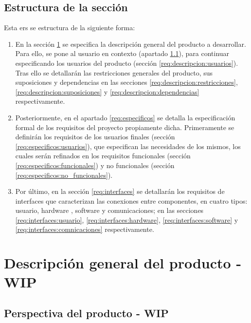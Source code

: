         
    \subsection{Estructura de la sección}

        Esta \gls{ers} se estructura de la siguiente forma:

        \begin{enumerate}
            \item En la sección \ref{req:descripcion} se especifica la descripción general del producto a desarrollar. Para ello, se pone al usuario en contexto (apartado \ref{req:descripcion:perspectiva}), para continuar especificando los usuarios del producto (sección \ref{req:descripcion:usuarios}). Tras ello se detallarán las restricciones generales del producto, sus suposiciones y dependencias en las secciones 
            \ref{req:descripcion:restricciones}, \ref{req:descripcion:suposiciones} y \ref{req:descripcion:dependencias} respectivamente.
            \item Posteriormente, en el apartado \ref{req:especificos} se detalla la especificación formal de los requisitos del proyecto propiamente dicha. Primeramente se definirán los requisitos de los usuarios finales (sección \ref{req:especificos:usuarios}), que especifican las necesidades de los mismos, los cuales serán refinados en los requisitos funcionales (sección \ref{req:especificos:funcionales}) y no funcionales (sección \ref{req:especificos:no_funcionales}).
            \item Por último, en la sección \ref{req:interfaces} se detallarán los requisitos de interfaces que caracterizan las conexiones entre componentes, en cuatro tipos: usuario, hardware , software y comunicaciones; en las secciones \ref{req:interfaces:usuario}, \ref{req:interfaces:hardware}, \ref{req:interfaces:software} y \ref{req:interfaces:comnicaciones} respectivamente.
        \end{enumerate}
        
\section{Descripción general del producto - WIP}
    \label{req:descripcion}

    \subsection{Perspectiva del producto - WIP}
        \label{req:descripcion:perspectiva}
        
